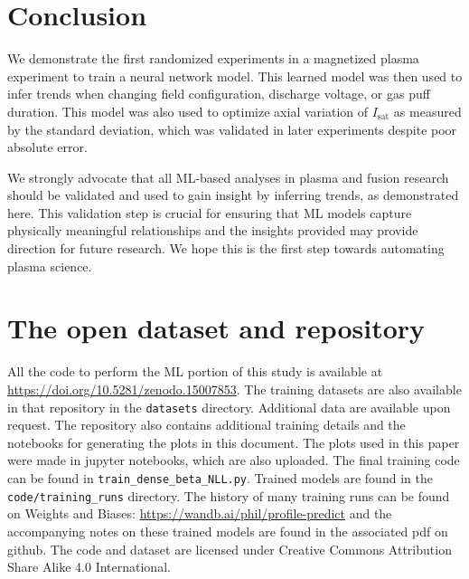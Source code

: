 \section{Conclusion}
\label{sec:conclusion}

We demonstrate the first randomized experiments in a magnetized plasma experiment to train a neural network model. This learned model was then used to infer trends when changing field configuration, discharge voltage, or gas puff duration. This model was also used to optimize axial variation of $I_\text{sat}$ as measured by the standard deviation, which was validated in later experiments despite poor absolute error. 

We strongly advocate that all ML-based analyses in plasma and fusion research should be validated  and used to gain insight by inferring trends, as demonstrated here. This validation step is crucial for ensuring that ML models capture physically meaningful relationships and the insights provided may provide direction for future research. We hope this is the first step towards automating plasma science.





\section{The open dataset and repository} 
\label{app:repo}
All the code to perform the ML portion of this study is available at \url{https://doi.org/10.5281/zenodo.15007853}. The training datasets are also available in that repository in the \texttt{datasets} directory. Additional data are available upon request. The repository also contains additional training details and the notebooks for generating the plots in this document. 
The plots used in this paper were made in jupyter notebooks, which are also uploaded. The final training code can be found in \texttt{train\_dense\_beta\_NLL.py}. Trained models are found in the \texttt{code/training\_runs} directory.
The history of many training runs can be found on Weights and Biases: \url{https://wandb.ai/phil/profile-predict} and the accompanying notes on these trained models are found in the associated pdf on github.
The code and dataset are licensed under Creative Commons Attribution Share Alike 4.0 International. 
